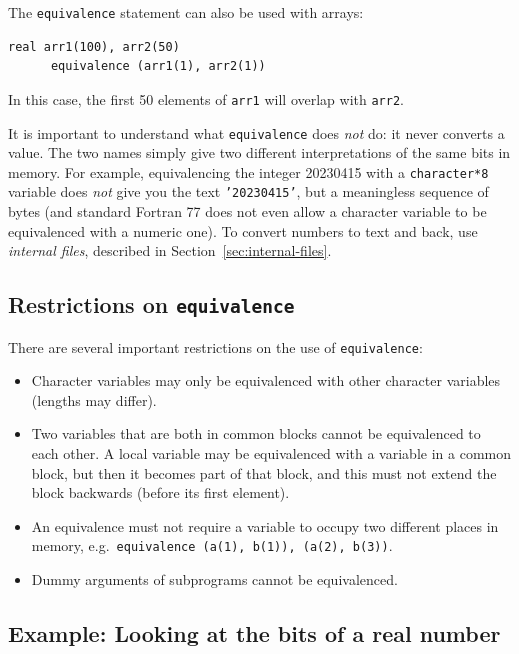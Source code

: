 The \texttt{equivalence} statement can also be used with arrays:

\begin{lstlisting}[style=fortran77]
      real arr1(100), arr2(50)
      equivalence (arr1(1), arr2(1))
\end{lstlisting}

In this case, the first 50 elements of \texttt{arr1} will overlap with \texttt{arr2}.

It is important to understand what \texttt{equivalence} does \emph{not} do: it never converts a value. The two names simply give two different interpretations of the same bits in memory. For example, equivalencing the integer 20230415 with a \texttt{character*8} variable does \emph{not} give you the text \texttt{'20230415'}, but a meaningless sequence of bytes (and standard Fortran 77 does not even allow a character variable to be equivalenced with a numeric one). To convert numbers to text and back, use \emph{internal files}, described in Section~\ref{sec:internal-files}.

\subsection{Restrictions on \texttt{equivalence}}

There are several important restrictions on the use of \texttt{equivalence}:

\begin{itemize}
    \item Character variables may only be equivalenced with other character variables (lengths may differ).
    \item Two variables that are both in common blocks cannot be equivalenced to each other. A local variable may be equivalenced with a variable in a common block, but then it becomes part of that block, and this must not extend the block backwards (before its first element).
    \item An equivalence must not require a variable to occupy two different places in memory, e.g.\ \texttt{equivalence (a(1), b(1)), (a(2), b(3))}.
    \item Dummy arguments of subprograms cannot be equivalenced.
\end{itemize}

\subsection{Example: Looking at the bits of a real number}

